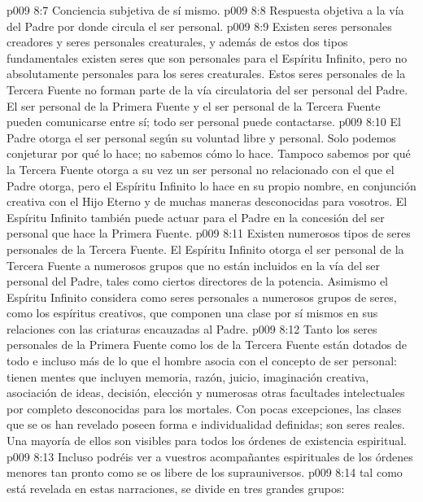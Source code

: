 \vs p009 8:7 Conciencia subjetiva de sí mismo.
\vs p009 8:8 Respuesta objetiva a la vía del Padre por donde circula el ser personal.
\vs p009 8:9 \pc Existen seres personales creadores y seres personales creaturales, y además de estos dos tipos fundamentales existen  seres que son personales para el Espíritu Infinito, pero no absolutamente personales para los seres creaturales. Estos seres personales de la Tercera Fuente no forman parte de la vía circulatoria del ser personal del Padre. El ser personal de la Primera Fuente y el ser personal de la Tercera Fuente pueden comunicarse entre sí; todo ser personal puede contactarse.
\vs p009 8:10 \pc El Padre otorga el ser personal según su voluntad libre y personal. Solo podemos conjeturar por qué lo hace; no sabemos cómo lo hace. Tampoco sabemos por qué la Tercera Fuente otorga a su vez un ser personal no relacionado con el que el Padre otorga, pero el Espíritu Infinito lo hace en su propio nombre, en conjunción creativa con el Hijo Eterno y de muchas maneras desconocidas para vosotros. El Espíritu Infinito también puede actuar para el Padre en la concesión del ser personal que hace la Primera Fuente.
\vs p009 8:11 \pc Existen numerosos tipos de seres personales de la Tercera Fuente. El Espíritu Infinito otorga el ser personal de la Tercera Fuente a numerosos grupos que no están incluidos en la vía del ser personal del Padre, tales como ciertos directores de la potencia. Asimismo el Espíritu Infinito considera como seres personales a numerosos grupos de seres, como los espíritus creativos, que componen una clase por sí mismos en sus relaciones con las criaturas encauzadas al Padre.
\vs p009 8:12 Tanto los seres personales de la Primera Fuente como los de la Tercera Fuente están dotados de todo e incluso más de lo que el hombre asocia con el concepto de ser personal: tienen mentes que incluyen memoria, razón, juicio, imaginación creativa, asociación de ideas, decisión, elección y numerosas otras facultades intelectuales por completo desconocidas para los mortales. Con pocas excepciones, las clases que se os han revelado poseen forma e individualidad definidas; son seres reales. Una mayoría de ellos son visibles para todos los órdenes de existencia espiritual.
\vs p009 8:13 Incluso podréis ver a vuestros acompañantes espirituales de los órdenes menores tan pronto como se os libere de los suprauniversos.
\vs p009 8:14 \pc {} tal como está revelada en estas narraciones, se divide en tres grandes grupos:
